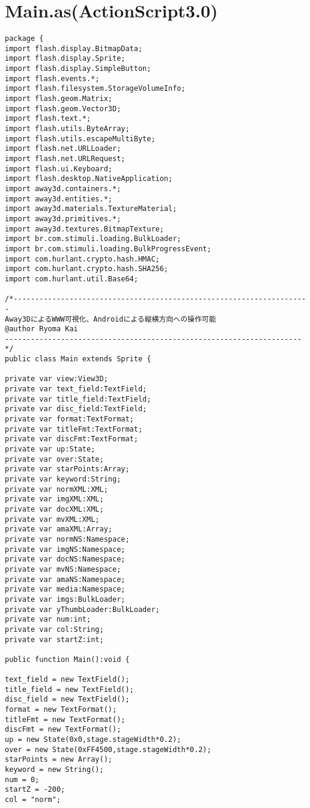 \section{Main.as(ActionScript3.0)}
{\scriptsize
\begin{verbatim}
package {
import flash.display.BitmapData;
import flash.display.Sprite;
import flash.display.SimpleButton;
import flash.events.*;
import flash.filesystem.StorageVolumeInfo;
import flash.geom.Matrix;
import flash.geom.Vector3D;
import flash.text.*;
import flash.utils.ByteArray;
import flash.utils.escapeMultiByte;
import flash.net.URLLoader;
import flash.net.URLRequest;
import flash.ui.Keyboard;
import flash.desktop.NativeApplication;
import away3d.containers.*;
import away3d.entities.*;
import away3d.materials.TextureMaterial;
import away3d.primitives.*;
import away3d.textures.BitmapTexture;
import br.com.stimuli.loading.BulkLoader;
import br.com.stimuli.loading.BulkProgressEvent;
import com.hurlant.crypto.hash.HMAC;
import com.hurlant.crypto.hash.SHA256;
import com.hurlant.util.Base64;

/*---------------------------------------------------------------------
Away3DによるWWW可視化、Androidによる縦横方向への操作可能
@author Ryoma Kai
---------------------------------------------------------------------*/
public class Main extends Sprite {

private var view:View3D;
private var text_field:TextField;
private var title_field:TextField;
private var disc_field:TextField;
private var format:TextFormat;
private var titleFmt:TextFormat;
private var discFmt:TextFormat;
private var up:State;
private var over:State;
private var starPoints:Array;
private var keyword:String;
private var normXML:XML;
private var imgXML:XML;
private var docXML:XML;
private var mvXML:XML;
private var amaXML:Array;
private var normNS:Namespace;
private var imgNS:Namespace;
private var docNS:Namespace;
private var mvNS:Namespace;
private var amaNS:Namespace;
private var media:Namespace;
private var imgs:BulkLoader;
private var yThumbLoader:BulkLoader;
private var num:int;
private var col:String;
private var startZ:int;

public function Main():void {

text_field = new TextField();
title_field = new TextField();
disc_field = new TextField();
format = new TextFormat();
titleFmt = new TextFormat();
discFmt = new TextFormat();
up = new State(0x0,stage.stageWidth*0.2);
over = new State(0xFF4500,stage.stageWidth*0.2);
starPoints = new Array();
keyword = new String();
num = 0;
startZ = -200;
col = "norm";


\end{verbatim}}
